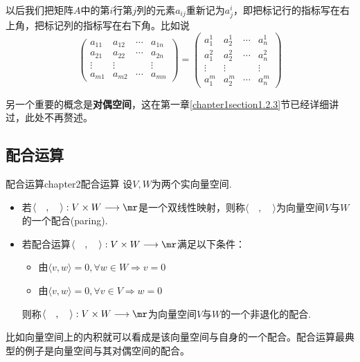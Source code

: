 以后我们把矩阵$A$中的第$i$行第$j$列的元素$a_{ij}$重新记为$a^{i}_{j}$，即把标记行的指标写在右上角，把标记列的指标写在右下角。比如说
\[
\left( \begin{array}{cccc}{a_{11}} & {a_{12}} & {\cdots} & {a_{1 n}} \\ {a_{21}} & {a_{22}} & {\cdots} & {a_{2 n}} \\ {\vdots} & {\vdots} & { } & {\vdots} \\ {a_{m 1}} & {a_{m 2}} & {\cdots} & {a_{m n}}\end{array}\right)=\left( \begin{array}{cccc}{a_{1}^{1}} & {a^{1}_{2}} & {\cdots} & {a^{1}_{ n}} \\ {a^{2}_{1}} & {a^{2}_{2}} & {\cdots} & {a^{2}_{ n}} \\ {\vdots} & {\vdots} & { } & {\vdots} \\ {a^{m}_{ 1}} & {a^{m}_{ 2}} & {\cdots} & {a^{m}_{ n}}\end{array}\right)
\]

另一个重要的概念是\textbf{对偶空间}，这在第一章\ref{chapter1section1.2.3}节已经详细讲过，此处不再赘述。

\subsection{配合运算}
\label{配合}

\begin{mydef}{配合运算}{chapter2配合运算}
设$V,W$为两个实向量空间. 
\begin{itemize}
\item 若$\langle \quad ,\quad\rangle:V\times W\longrightarrow \mr$是一个双线性映射，则称$\langle \quad ,\quad\rangle$为向量空间$V$与$W$的一个配合(paring).
\item 若配合运算$\langle \quad ,\quad\rangle:V\times W\longrightarrow \mr$满足以下条件：
		\begin{itemize}
		\item[(1)] 由$\langle v,w\rangle=0,\forall w\in W\Rightarrow v=0$
		\item[(2)] 由$\langle v,w\rangle=0,\forall v\in V\Rightarrow w=0$
		\end{itemize}
	   则称$\langle \quad ,\quad\rangle:V\times W\longrightarrow \mr$为向量空间$V$与$W$的一个非退化的配合.
\end{itemize}
\end{mydef}

比如向量空间上的内积就可以看成是该向量空间与自身的一个配合。配合运算最典型的例子是向量空间与其对偶空间的配合。

